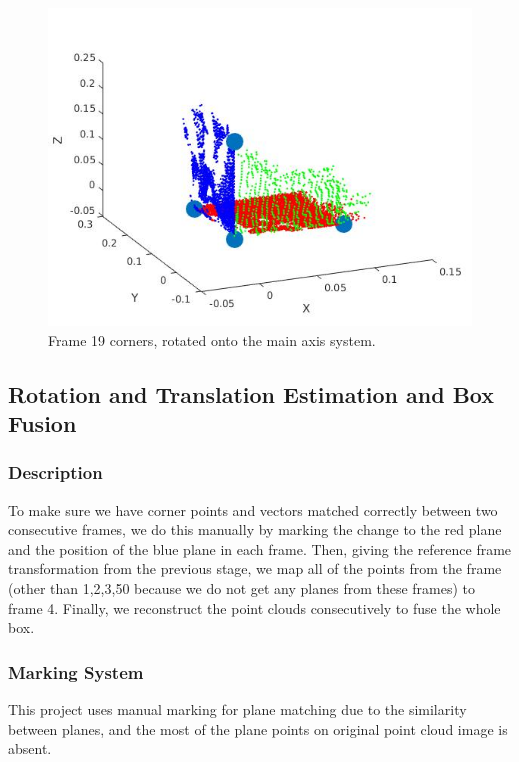 \documentclass[10pt,a4paper]{article}
\begin{document}
\vspace{-10pt}
\hspace{-40pt}
\begin{figure}[!h]
		\centering
		\includegraphics[scale=0.5]{rotated.jpg}
		\caption{ \small Frame 19 corners, rotated onto the main axis system.}
		\label{fig:51}
\end{figure} 


\newpage

\subsection{Rotation and Translation Estimation and Box Fusion}
\subsubsection{Description}
To make sure we have corner points and vectors matched correctly between two consecutive frames, we do this manually by marking the change to the red plane and the position of the blue plane in each frame. 
Then, giving the reference frame transformation from the previous stage, we map all of the points from the frame (other than 1,2,3,50 because we do not get any planes from these frames) to frame 4. Finally, we reconstruct the point clouds consecutively to fuse the whole box. 

\subsubsection{Marking System}
This project uses manual marking for plane matching due to the similarity between planes, and the most of the plane points on original point cloud image is absent.
\end{document}
